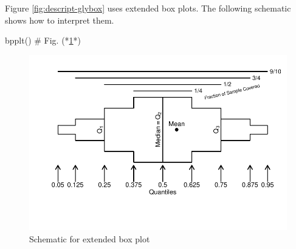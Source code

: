 Figure \ref{fig:descript-glybox} uses extended box plots.  The
following schematic shows how to interpret them.
\begin{Schunk}
\begin{Sinput}
bpplt()   # Fig. (*\ref{fig:descript-bpplt}*)
\end{Sinput}
\begin{figure}[htbp]

\centerline{\includegraphics{descript-bpplt-1} }

\caption[Schematic for extended box plot]{Schematic for extended box plot}\label{fig:descript-bpplt}
\end{figure}
\end{Schunk}

